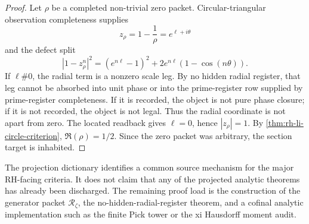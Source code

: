 \begin{proof}
Let $\rho$ be a completed non-trivial zero packet. Circular-triangular
observation completeness supplies
$$
z_{\rho}=1-\frac1{\rho}=e^{\ell+i\theta}
$$
and the defect split
$$
|1-z_{\rho}^n|^2
=
(e^{n\ell}-1)^2
+
2e^{n\ell}(1-\cos(n\theta)).
$$
If $\ell\#0$, the radial term is a nonzero scale leg. By no hidden
radial register, that leg cannot be absorbed into unit phase or into the
prime-register row supplied by prime-register completeness. If it is
recorded, the object is not pure phase closure; if it is not recorded,
the object is not legal. Thus the radial coordinate is not apart from
zero. The located readback gives $\ell=0$, hence $|z_{\rho}|=1$. By
\autoref{thm:rh-li-circle-criterion}, $\Re(\rho)=1/2$. Since the zero
packet was arbitrary, the section target is inhabited.
\end{proof}

\begin{principle}
\label{prin:rh-circle-triangle-projection-dictionary-status}
The projection dictionary identifies a common source mechanism for the
major RH-facing criteria. It does not claim that any of the projected
analytic theorems has already been discharged. The remaining proof load
is the construction of the generator packet $\mathcal R_{\zeta}$, the
no-hidden-radial-register theorem, and a cofinal analytic implementation
such as the finite Pick tower or the xi Hausdorff moment audit.
\end{principle}

